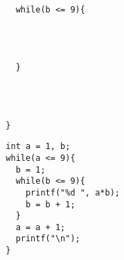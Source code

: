 \documentclass[a4j]{jarticle}
\begin{document}
\begin{multicols*}{2}
\begin{verbatim}
    while(b <= 9){




    }




  }
\end{verbatim}
\vspace{1cm}
\else
\begin{verbatim}
  int a = 1, b;
  while(a <= 9){
    b = 1;
    while(b <= 9){
      printf("%d ", a*b);
      b = b + 1;
    }
    a = a + 1;
    printf("\n");
  }
\end{verbatim}
\vspace{5cm}
\fi







%
%
%
%
%
%
%
%
%
%
%
%
%
%
%
%
%
%
%
%
%
%
%
%



\end{multicols*}
\end{document}
